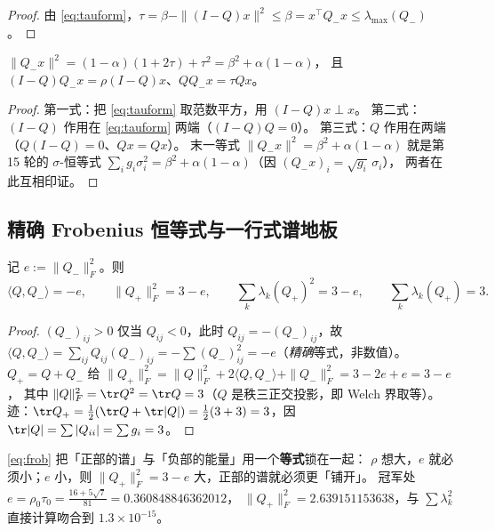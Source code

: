 \begin{proof}
由 \eqref{eq:tauform}，$\tau=\beta-\|(I-Q)x\|^2\le\beta=x^\top Q_-x\le\lambda_{\max}(Q_-)$。
\end{proof}

\begin{lemma}[$Q_-x$ 的精确范数]\label{lem:normqmx}
$\|Q_-x\|^2=(1-\alpha)(1+2\tau)+\tau^2=\beta^2+\alpha(1-\alpha)$，
且 $(I-Q)Q_-x=\rho(I-Q)x$、$QQ_-x=\tau Qx$。
\end{lemma}

\begin{proof}
第一式：把 \eqref{eq:tauform} 取范数平方，用 $(I-Q)x\perp x$。
第二式：$(I-Q)$ 作用在 \eqref{eq:tauform} 两端（$(I-Q)Q=0$）。
第三式：$Q$ 作用在两端（$Q(I-Q)=0$、$Qx=Qx$）。
末一等式 $\|Q_-x\|^2=\beta^2+\alpha(1-\alpha)$ 就是第 15 轮的 $\sigma$-恒等式
$\sum_ig_i\sigma_i^2=\beta^2+\alpha(1-\alpha)$（因 $(Q_-x)_i=\sqrt{g_i}\,\sigma_i$），
两者在此互相印证。
\end{proof}

\subsection{精确 Frobenius 恒等式与一行式谱地板}\label{sec:r17:frob}

\begin{lemma}[正部与负部的能量守恒]\label{lem:frob}
记 $e:=\|Q_-\|_F^2$。则
\begin{equation}\label{eq:frob}
\langle Q,Q_-\rangle=-e,\qquad \|Q_+\|_F^2=3-e,\qquad \sum_k\lambda_k(Q_+)^2=3-e,\qquad \sum_k\lambda_k(Q_+)=3 .
\end{equation}
\end{lemma}

\begin{proof}
$(Q_-)_{ij}>0$ 仅当 $Q_{ij}<0$，此时 $Q_{ij}=-(Q_-)_{ij}$，故
$\langle Q,Q_-\rangle=\sum_{ij}Q_{ij}(Q_-)_{ij}=-\sum(Q_-)_{ij}^2=-e$（\emph{精确}等式，非数值）。
$Q_+=Q+Q_-$ 给 $\|Q_+\|_F^2=\|Q\|_F^2+2\langle Q,Q_-\rangle+\|Q_-\|_F^2=3-2e+e=3-e$，
其中 $\|Q\|_F^2=\tr Q^2=\tr Q=3$（$Q$ 是秩三正交投影，即 Welch 界取等）。
迹：$\tr Q_+=\tfrac12(\tr Q+\tr|Q|)=\tfrac12(3+3)=3$，因 $\tr|Q|=\sum|Q_{ii}|=\sum g_i=3$。
\end{proof}

\begin{remark}[这条恒等式的价值]\label{rmk:frobval}
\eqref{eq:frob} 把「正部的谱」与「负部的能量」用一个\textbf{等式}锁在一起：
$\rho$ 想大，$e$ 就必须小；$e$ 小，则 $\|Q_+\|_F^2=3-e$ 大，正部的谱就必须更「铺开」。
冠军处 $e=\rho_0\tau_0=\frac{16+5\sqrt7}{81}=0.360848846362012$，
$\|Q_+\|_F^2=2.639151153638$，与 $\sum\lambda_k^2$ 直接计算吻合到 $1.3\times10^{-15}$。
\end{remark}

